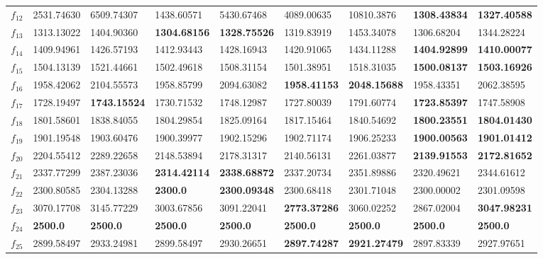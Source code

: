 \begin{table*}[t!]
\begin{tabular}{|p{0.8cm}|p{1.6cm}|p{1.6cm}|p{1.6cm}|p{1.6cm}|p{1.6cm}|p{1.6cm}|p{1.6cm}|p{1.6cm}|}
$f_{12}$  & 2531.74630 & 6509.74307 & 1438.60571 & 5430.67468 & 4089.00635 & 10810.3876 & \textbf{1308.43834} & \textbf{1327.40588} \\ 
$f_{13}$ & 1313.13022 & 1404.90360 & \textbf{1304.68156} & \textbf{1328.75526} & 1319.83919 & 1453.34078 & 1306.68204 & 1344.28224 \\ 
$f_{14}$  & 1409.94961 & 1426.57193 & 1412.93443 & 1428.16943 & 1420.91065 & 1434.11288 & \textbf{1404.92899} & \textbf{1410.00077} \\ 
$f_{15}$  & 1504.13139 & 1521.44661 & 1502.49618 & 1508.31154 & 1501.38951 & 1518.31035 & \textbf{1500.08137} & \textbf{1503.16926} \\ 
$f_{16}$  & 1958.42062 & 2104.55573 & 1958.85799 & 2094.63082 & \textbf{1958.41153} & \textbf{2048.15688} & 1958.43351 & 2062.38595 \\ 
$f_{17}$  & 1728.19497 & \textbf{1743.15524} & 1730.71532 & 1748.12987 & 1727.80039 & 1791.60774 & \textbf{1723.85397} & 1747.58908 \\ 
$f_{18}$  & 1801.58601 & 1838.84055 & 1804.29854 & 1825.09164 & 1817.15464 & 1840.54692 & \textbf{1800.23551} & \textbf{1804.01430} \\ 
$f_{19}$  & 1901.19548 & 1903.60476 & 1900.39977 & 1902.15296 & 1902.71174 & 1906.25233 & \textbf{1900.00563} & \textbf{1901.01412} \\ 
$f_{20}$  & 2204.55412 & 2289.22658 & 2148.53894 & 2178.31317 & 2140.56131 & 2261.03877 & \textbf{2139.91553} & \textbf{2172.81652} \\ 
$f_{21}$  & 2337.77299 & 2387.23036 & \textbf{2314.42114} & \textbf{2338.68872} & 2337.20734 & 2351.89886 & 2320.49621 & 2344.61612 \\ 
$f_{22}$  & 2300.80585 & 2304.13288 & \textbf{2300.0} & \textbf{2300.09348} & 2300.68418 & 2301.71048 & 2300.00002 & 2301.09598 \\ 
$f_{23}$  & 3070.17708 & 3145.77229 & 3003.67856 & 3091.22041 & \textbf{2773.37286} & 3060.02252 & 2867.02004 & \textbf{3047.98231} \\ 
$f_{24}$  & \textbf{2500.0} & \textbf{2500.0} & \textbf{2500.0} & \textbf{2500.0} & \textbf{2500.0} & \textbf{2500.0} & \textbf{2500.0} & \textbf{2500.0} \\ 
$f_{25}$  & 2899.58497 & 2933.24981 & 2899.58497 & 2930.26651 & \textbf{2897.74287} & \textbf{2921.27479} & 2897.83339 & 2927.97651 \\ 

\end{tabular}
\end{table*}
